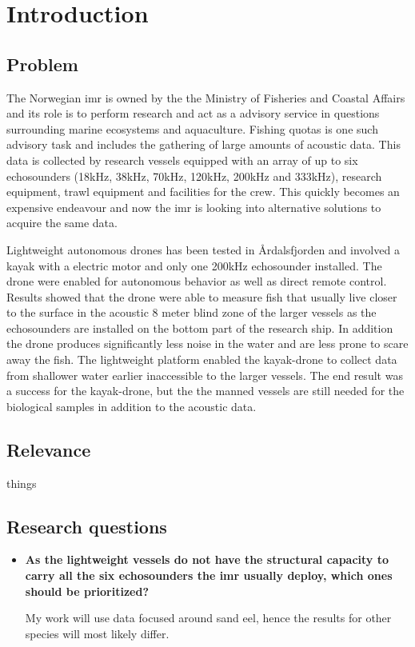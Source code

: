 \chapter{Introduction}


    \section{Problem}

    The Norwegian \gls{imr} is owned by the the Ministry of Fisheries and Coastal Affairs and its role is to perform research and act as a advisory service in questions surrounding marine ecosystems and aquaculture\cite{IMR}. Fishing quotas is one such advisory task and includes the gathering of large amounts of acoustic data. This data is collected by research vessels\cite{IMR-vessels} equipped with an array of up to six echosounders (18kHz, 38kHz, 70kHz, 120kHz, 200kHz and 333kHz), research equipment, trawl equipment and facilities for the crew. This quickly becomes an expensive endeavour and now the \gls{imr} is looking into alternative solutions to acquire the same data. 
    
    Lightweight autonomous drones\cite{johnsen2020measuring} has been tested in Årdalsfjorden and involved a kayak with a electric motor and only one 200kHz echosounder installed. The drone were enabled for autonomous behavior as well as direct remote control. Results showed that the drone were able to measure fish that usually live closer to the surface in the acoustic 8 meter blind zone of the larger vessels as the echosounders are installed on the bottom part of the research ship. In addition the drone produces significantly less noise in the water and are less prone to scare away the fish. The lightweight platform enabled the kayak-drone to collect data from shallower water earlier inaccessible to the larger vessels. The end result was a success for the kayak-drone, but the the manned vessels are still needed for the biological samples in addition to the acoustic data. 
    
    
    \section{Relevance}
        things

\section{Research questions}
    \begin{itemize}
        \item \textbf{As the lightweight vessels do not have the structural capacity to carry all the six echosounders the \gls{imr} usually deploy, which ones should be prioritized?}
        
        My work will use data focused around sand eel, hence the results for other species will most likely differ.

\end{itemize}


